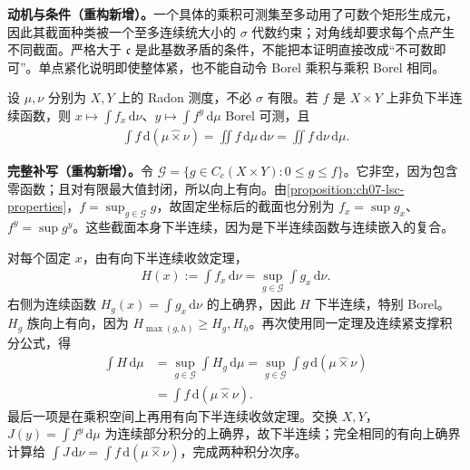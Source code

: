 \documentclass[../../main.tex]{subfiles}
\begin{document}
\begin{remark}
\textbf{动机与条件（重构新增）。}一个具体的乘积可测集至多动用了可数个矩形生成元，因此其截面种类被一个至多连续统大小的 $\sigma$ 代数约束；对角线却要求每个点产生不同截面。严格大于 $\mathfrak c$ 是此基数矛盾的条件，不能把本证明直接改成“不可数即可”。单点紧化说明即使整体紧，也不能自动令 Borel 乘积与乘积 Borel 相同。
\end{remark}
\begin{exercise}\label{exercise:ch07-lsc-product-integrals}
设 $\mu,\nu$ 分别为 $X,Y$ 上的 Radon 测度，不必 $\sigma$ 有限。若 $f$ 是 $X\times Y$ 上非负下半连续函数，则 $x\mapsto\int f_x\,\mathrm d\nu$、$y\mapsto\int f^y\,\mathrm d\mu$ Borel 可测，且
\begin{align*}
\int f\,\mathrm d(\mu\mathbin{\widehat\times}\nu)
=\iint f\,\mathrm d\mu\,\mathrm d\nu
=\iint f\,\mathrm d\nu\,\mathrm d\mu.
\end{align*}
\end{exercise}
\begin{solution}
\textbf{完整补写（重构新增）。}令 $\mathcal G=\{g\in C_c(X\times Y):0\leqslant g\leqslant f\}$。它非空，因为包含零函数；且对有限最大值封闭，所以向上有向。由\cref{proposition:ch07-lsc-properties}，$f=\sup_{g\in\mathcal G}g$，故固定坐标后的截面也分别为 $f_x=\sup g_x$、$f^y=\sup g^y$。这些截面本身下半连续，因为是下半连续函数与连续嵌入的复合。

对每个固定 $x$，由有向下半连续收敛定理，
\begin{align*}
H(x):=\int f_x\,\mathrm d\nu
=\sup_{g\in\mathcal G}\int g_x\,\mathrm d\nu.
\end{align*}
右侧为连续函数 $H_g(x)=\int g_x\,\mathrm d\nu$ 的上确界，因此 $H$ 下半连续，特别 Borel。$H_g$ 族向上有向，因为 $H_{\max(g,h)}\geqslant H_g,H_h$。再次使用同一定理及连续紧支撑积分公式，得
\begin{align*}
\int H\,\mathrm d\mu
&=\sup_{g\in\mathcal G}\int H_g\,\mathrm d\mu
=\sup_{g\in\mathcal G}\int g\,\mathrm d(\mu\mathbin{\widehat\times}\nu)\\
&=\int f\,\mathrm d(\mu\mathbin{\widehat\times}\nu).
\end{align*}
最后一项是在乘积空间上再用有向下半连续收敛定理。交换 $X,Y$，$J(y)=\int f^y\,\mathrm d\mu$ 为连续部分积分的上确界，故下半连续；完全相同的有向上确界计算给 $\int J\,\mathrm d\nu=\int f\,\mathrm d(\mu\mathbin{\widehat\times}\nu)$，完成两种积分次序。
\end{solution}
\end{document}
